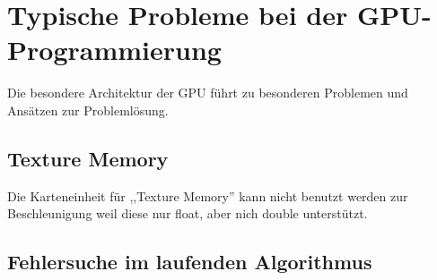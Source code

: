 \documentclass[journal]{IEEEtran}
\begin{document}
%





\section{Typische Probleme bei der GPU-Programmierung}


Die besondere Architektur der GPU führt zu besonderen Problemen
und Ansätzen zur Problemlösung.






\subsection{Texture Memory}

Die Karteneinheit für ,,Texture Memory'' kann nicht benutzt werden
zur Beschleunigung weil diese nur float, aber nich double unterstützt.

\subsection{Fehlersuche im laufenden Algorithmus}
\end{document}
